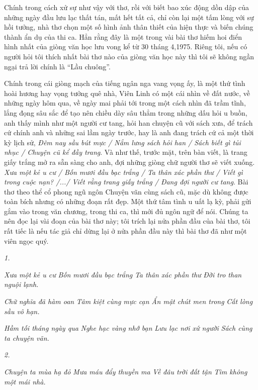\documentclass[../main.tex]{subfiles}
\begin{document}
\begin{multicols}{2}
Chính trong cách xử sự như vậy với thơ, rồi với biết bao xúc động dồn dập của những ngày đầu lưu lạc thất tán, mất hết tất cả, chỉ còn lại một tấm lòng với sự hồi tưởng, nhà thơ chọn một số hình ảnh thân thiết của hiện thực và biến chúng thành ẩn dụ của thi ca. Hẳn rằng đây là một trong vài bài thơ hiếm hoi điển hình nhất của giòng văn học lưu vong kể từ 30 tháng 4,1975. Riêng tôi, nếu có người hỏi tôi thích nhất bài thơ nào của giòng văn học này thì tôi sẽ không ngần ngại trả lời chính là “Lầu chuông”. 
 
Chính trong cái giòng mạch của tiếng ngân nga vang vọng ấy, là một thứ tình hoài hương hay vọng tưởng quê nhà, Viên Linh có một cái nhìn về đất nước, về những ngày hôm qua, về ngày mai phải tới trong một cách nhìn đã trầm tĩnh, lắng đọng sâu sắc để tạo nên chiều dày sâu thẳm trong những dấu hỏi u buồn, anh thấy mình như một người cư tang, hỏi han chuyện cũ với sách xưa, để trách cứ chính anh và những sai lầm ngày trước, hay là anh đang trách cứ cả một thời kỳ lịch sử, \textit{Đêm nay sầu bút mực / Nắm lưng sách hỏi han / Sách biết gì tủi nhục / Chuyện cũ kể đầy trang}. Và như thế, trước mặt, trên bàn viết, là trang giấy trắng mở ra sẵn sàng cho anh, đợi những giòng chữ người thơ sẽ viết xuống. \textit{Xưa một kẻ u cư / Bốn mươi đầu bạc trắng / Ta thân xác phần thư / Viết gì trong cuộc nạn?  /.../ Viết rằng trang giấy trắng / Đang đợi người cư tang}. Bài thơ theo thể cổ phong ngũ ngôn Chuyện vãn cùng sách cũ, mặc dù không được toàn bích nhưng có những đoạn rất đẹp. Một thứ tâm tình u uất lạ kỳ, phải gửi gắm vào trong văn chương, trong thi ca, thì mới đủ ngôn ngữ để nói. Chúng ta nên đọc lại vài đoạn của bài thơ này; tôi trích lại nửa phần đầu của bài thơ, tôi rất tiếc là nếu tác giả chỉ dừng lại ở nửa phần đầu này thì bài thơ đã như một viên ngọc quý. 
 
\textit{1.} 
 
\textit{Xưa một kẻ u cư} 
\textit{Bốn mươi đầu bạc trắng} 
\textit{Ta thân xác phần thư} 
\textit{Đời tro than nguội lạnh.} 
 
\textit{Chữ nghĩa đã hàm oan} 
\textit{Tâm kiệt cùng mực cạn} 
\textit{Ẩn mật chút men trong} 
\textit{Cất lòng sầu vô hạn.} 
 
\textit{Hầm tối tháng ngày qua} 
\textit{Nghe hạc vàng nhớ bạn} 
\textit{Lưu lạc nơi xứ người} 
\textit{Sách cùng ta chuyện vãn.} 
 
\textit{2.} 
 
\textit{Chuyện ta mùa hạ đỏ} 
\textit{Mưa máu đẩy thuyền ma} 
\textit{Về đâu trời đất tận} 
\textit{Tìm không một mái nhà.} 
 

\end{multicols}
\end{document}
